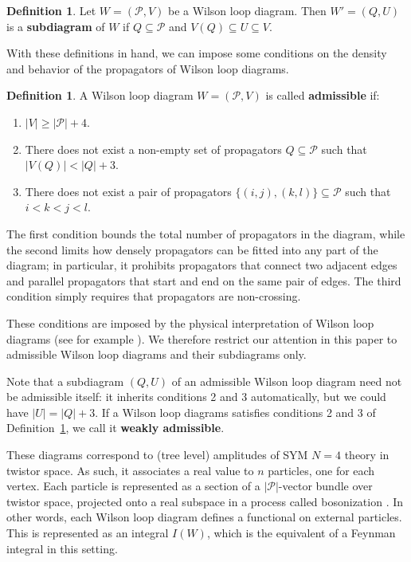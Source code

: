 \documentclass[11pt]{article}
\newcommand{\cP}{\mathcal{P}}
\theoremstyle{remark}
\theoremstyle{definition}
\newtheorem{dfn}[thm]{Definition}
\begin{document}
\begin{dfn} \label{subdiagramdfn}
Let $W = (\cP, V)$ be a Wilson loop diagram. Then $W' = (Q,U)$ is a {\bf subdiagram} of $W$ if $Q \subseteq \cP$ and $V(Q) \subseteq U \subseteq V$.
\end{dfn}



With these definitions in hand, we can impose some conditions on the density and behavior of the propagators of Wilson loop diagrams.

\begin{dfn}\label{admisdfn}
A Wilson loop diagram $W = (\cP, V)$ is called {\bf admissible} if:
\begin{enumerate}
\item $|V| \geq |\cP| + 4$.
\item There does not exist a non-empty set of propagators $Q \subseteq \cP$ such that $|V(Q)| < |Q| + 3$.
\item There does not exist a pair of propagators $\{(i,j),(k,l)\} \subseteq \cP$ such that $i < k < j < l$.
\end{enumerate}
 \end{dfn}

The first condition bounds the total number of propagators in the diagram, while the second limits how densely propagators can be fitted into any part of the diagram; in particular, it prohibits propagators that connect two adjacent edges and parallel propagators that start and end on the same pair of edges. The third condition simply requires that propagators are non-crossing. 

These conditions are imposed by the physical interpretation of Wilson loop diagrams (see for example \cite{Adamo:2011pv,Adamo:2012xe,wilsonloop,LipsteinMason}). We therefore restrict our attention in this paper to admissible Wilson loop diagrams and their subdiagrams only. 

Note that a subdiagram $(Q,U)$ of an admissible Wilson loop diagram need not be admissible itself: it inherits conditions 2 and 3 automatically, but we could have $|U| = |Q| + 3$. If a Wilson loop diagrams satisfies conditions 2 and 3 of Definition~\ref{admisdfn}, we call it {\bf weakly admissible}.

These diagrams correspond to (tree level) amplitudes of SYM $N=4$ theory in twistor space. As such, it associates a real value to $n$ particles, one for each vertex. Each particle is represented as a section of a $|\cP|$-vector bundle over twistor space, projected onto a real subspace in a process called bosonization \cite{Arkani-Hamed:2013jha}. In other words, each Wilson loop diagram defines a functional on external particles. This is represented as an integral $I(W)$, which is the equivalent of a Feynman integral in this setting. 
\end{document}
